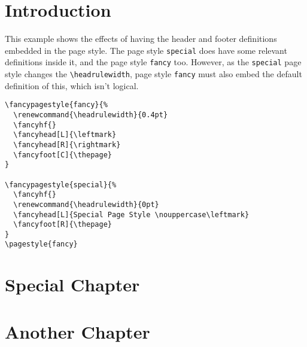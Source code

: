 \documentclass[oneside]{report}
\renewcommand{\headrulewidth}{0.4pt}
\renewcommand{\headrulewidth}{0pt}
\begin{document}
\chapter{Introduction}

This example shows the effects of having the header and footer definitions embedded in the page style. The page style \texttt{special} does have some relevant definitions inside it, and the page style \texttt{fancy} too. However, as the \texttt{special} page style changes the \verb|\headrulewidth|, page style \texttt{fancy} must also embed the default definition of this, which isn't logical.

\begin{verbatim}
\fancypagestyle{fancy}{%
  \renewcommand{\headrulewidth}{0.4pt}
  \fancyhf{}
  \fancyhead[L]{\leftmark}
  \fancyhead[R]{\rightmark}
  \fancyfoot[C]{\thepage}
}

\fancypagestyle{special}{%
  \fancyhf{}
  \renewcommand{\headrulewidth}{0pt}
  \fancyhead[L]{Special Page Style \nouppercase\leftmark}
  \fancyfoot[R]{\thepage}
}
\pagestyle{fancy}
\end{verbatim}

\bigskip

\lipsum[1-5]

\chapter{Special Chapter}
\pagestyle{special}
\lipsum

\chapter{Another Chapter}
\pagestyle{fancy}
\lipsum
\end{document}
